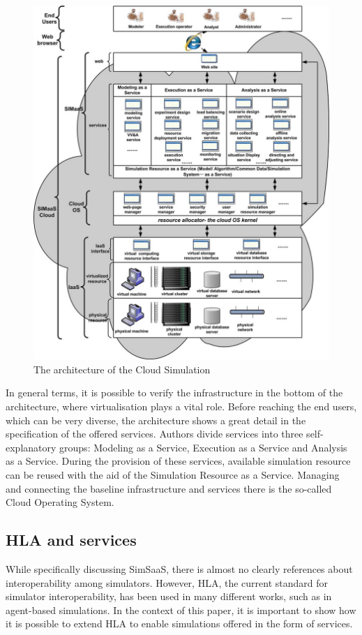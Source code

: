 \documentclass[conference]{IEEEtran}
\begin{document}
\begin{figure}[h!]
\centering
\includegraphics[width=.9\linewidth]{csim_arch.png}
\caption{ The architecture of the Cloud Simulation~\protect\cite{Liu201271}}
\label{fig:csim_arch}
\vspace{-0.9em}
\end{figure}

In general terms, it is possible to verify the infrastructure in the bottom of the architecture, where virtualisation plays a vital role. Before reaching the end users, which can be very diverse, the architecture shows a great detail in the specification of the offered services. Authors divide services into three self-explanatory groups: Modeling as a Service, Execution as a Service and Analysis as a Service. During the provision of these services, available simulation resource can be reused with the aid of the Simulation Resource as a Service. Managing and connecting the baseline infrastructure and services there is the so-called Cloud Operating System.

\subsection{HLA and services}
While specifically discussing SimSaaS, there is almost no clearly references about interoperability among simulators. However, HLA, the current standard for simulator interoperability, has been used in many different works, such as in agent-based simulations. In the context of this paper, it is important to show how it is possible to extend HLA to enable simulations offered in the form of services.
\end{document}
